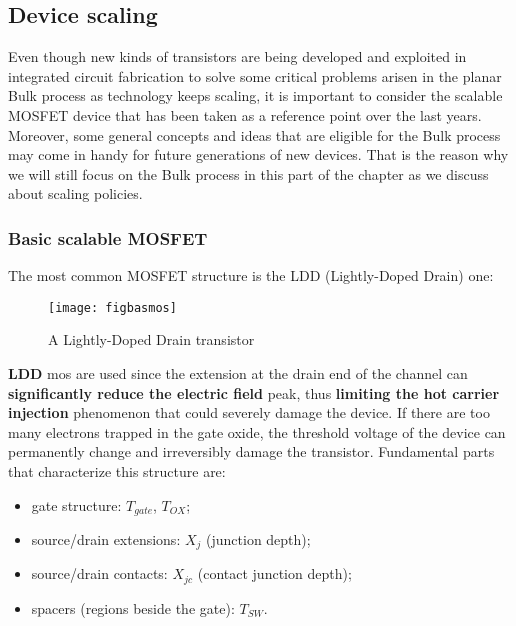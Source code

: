 \documentclass[a4paper, 12pt, twoside, openright]{report}
\begin{document}
\subsection{Device scaling}

Even though new kinds of transistors are being developed and exploited in integrated circuit fabrication to solve some critical problems arisen in the planar Bulk process as technology keeps scaling, it is important to consider the scalable MOSFET device that has been taken as a reference point over the last years. Moreover, some general concepts and ideas that are eligible for the Bulk process may come in handy for future generations of new devices. That is the reason why we will still focus on the Bulk process in this part of the chapter as we discuss about scaling policies. 

\subsubsection{Basic scalable MOSFET}

The most common MOSFET structure is the LDD (Lightly-Doped Drain) one:

	\begin{figure}[h]
	\centering
	\texttt{[image: figbasmos]}
	\caption{A Lightly-Doped Drain transistor}
	\label{}
	\end{figure}

\textbf{LDD} mos are used since the extension at the drain end of the channel can \textbf{significantly reduce the electric field} peak, thus \textbf{limiting the hot carrier injection} phenomenon that could severely damage the device. If there are too many electrons trapped in the gate oxide, the threshold voltage of the device can permanently change and irreversibly damage the transistor.
Fundamental parts that characterize this structure are:


\begin{itemize}
\item gate structure: $T_{gate}$, $T_{OX}$;
\item source/drain extensions: $X_{j}$ (junction depth);
\item source/drain contacts: $X_{jc}$ (contact junction depth);
\item spacers (regions beside the gate): $T_{SW}$.
\end{itemize}
\end{document}

